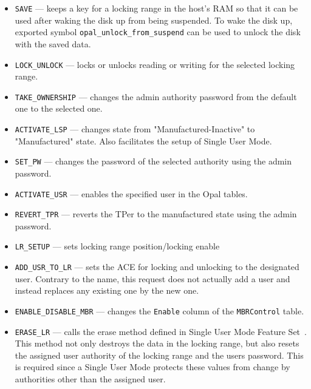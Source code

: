 \begin{itemize}
\item \verb|SAVE| --- keeps a key for a locking range in the host's RAM so that it can be used after waking the disk up from being suspended. To wake the disk up, exported symbol \verb|opal_unlock_from_suspend| can be used to unlock the disk with the saved data. %
\item \verb|LOCK_UNLOCK| --- locks or unlocks reading or writing for the selected locking range.
\item \verb|TAKE_OWNERSHIP| --- changes the admin authority password from the default one to the selected one. 
\item \verb|ACTIVATE_LSP| --- changes state from "Manufactured-Inactive" to "Manufactured" state. Also facilitates the setup of Single User Mode. 
\item \verb|SET_PW| --- changes the password of the selected authority using the admin password.
\item \verb|ACTIVATE_USR| --- enables the specified user in the Opal tables.
\item \verb|REVERT_TPR| --- reverts the TPer to the manufactured state using the admin password.
\item \verb|LR_SETUP| --- sets locking range position/locking enable
\item \verb|ADD_USR_TO_LR| --- sets the ACE for locking and unlocking to the designated user. Contrary to the name, this request does not actually add a user and instead replaces any existing one by the new one. %
\item \verb|ENABLE_DISABLE_MBR| --- changes the \verb|Enable| column of the \verb|MBRControl| table. %
\item \verb|ERASE_LR| --- calls the erase method defined in Single User Mode Feature Set~\cite{tcg-sum}. This method not only destroys the data in the locking range, but also resets the assigned user authority of the locking range and the users password. This is required since a Single User Mode protects these values from change by authorities other than the assigned user.

\end{itemize}

